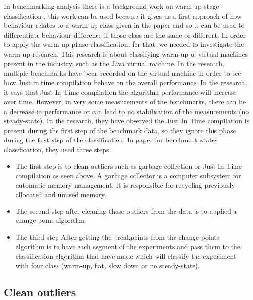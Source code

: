 \documentclass[12pt,a4paper]{article}
\begin{document}
In benchmarking analysis there is a background work on warm-up stage classification \cite{barrett2017virtual}, this work can be used because it gives us a first approach of how behaviour relates to a warm-up class given in the paper and so it can be used to differentiate behaviour difference if those class are the same or different. In order to apply the warm-up phase classification, for that, we needed to investigate the warm-up research.
This research is about classifying warm-up of virtual machines present in the industry, such as the Java virtual machine. 
In the research, multiple benchmarks have been recorded on the virtual machine in order to see how Just in time compilation behave on the overall performance.
In the research, it says that Just In Time compilation the algorithm performance will increase over time. However, in very some measurements of the benchmarks, there can be a decrease in performance or can lead to no stabilisation of the measurements (no steady-state). In the research, they have observed the Just In Time compilation is present during the first step of the benchmark data, so they ignore this phase during the first step of the classification.
In \citep{barrett2017virtual} paper for benchmark states classification, they used three steps.

\begin{itemize}
    \item The first step is to clean outliers such as garbage collection or Just In Time compilation as seen above. A garbage collector is a computer subsystem for automatic memory management.  It is responsible for recycling previously allocated and unused memory.  
    \item The second step after cleaning those outliers from the data is to applied a change-point algorithm \citep{killick2014changepoint}
    \item The third step After getting the breakpoints from the change-points algorithm is to have each segment of the experiments and pass them to the classification algorithm that \citep{barrett2017virtual} have made which will classify the experiment with four class (warm-up, flat, slow down or no steady-state).
\end{itemize}




\subsection{Clean outliers}
\end{document}
